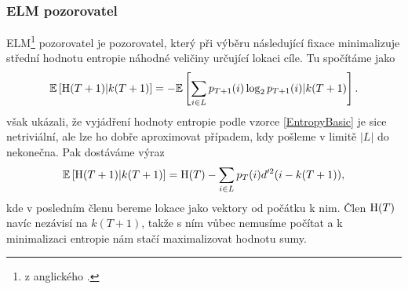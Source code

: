 \subsubsection{ELM pozorovatel}

ELM\footnote{z anglického .} pozorovatel je
pozorovatel, který při výběru následující fixace minimalizuje střední hodnotu
entropie náhodné veličiny určující lokaci cíle. Tu spočítáme jako
\begin{equation}\label{EntropyBasic}\mathbb{E}\left[\operatorname{H}(T+1)|k(T+1)\right]=-\mathbb{E}\left[\displaystyle\sum_{i\in
L}p_{T+1}(i)\log_2p_{T+1}(i)|k(T+1)\right].\end{equation} \citet{Najemnik09} však ukázali,
že vyjádření hodnoty entropie podle vzorce \eqref{EntropyBasic} je sice
netriviální, ale lze ho dobře aproximovat případem, kdy pošleme v limitě $|L|$
do nekonečna. Pak dostáváme výraz $$ \mathbb{E}\left[\operatorname{H}(T+1)|k(T+1)\right]= \operatorname{H}(T) -
\displaystyle\sum_{i\in L} p_T(i)d'^2(i-k(T+1)),$$ kde v posledním členu bereme
lokace jako vektory od počátku k nim. Člen $\operatorname{H}(T)$ navíc nezávisí na $k(T+1)$,
takže s ním vůbec nemusíme počítat a k minimalizaci entropie nám stačí
maximalizovat hodnotu sumy. 

